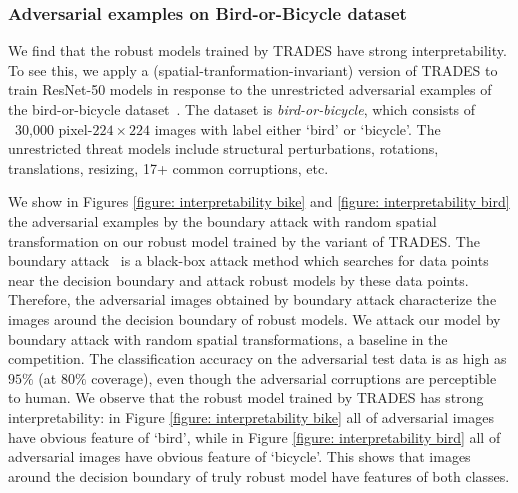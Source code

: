 \documentclass[11pt]{article}
\newcommand{\0}{\mathbf{0}}
\newcommand{\1}{\mathbf{1}}
\begin{document}
\subsubsection{Adversarial examples on Bird-or-Bicycle dataset}
We find that the robust models trained by TRADES have strong interpretability. To see this, we apply a (spatial-tranformation-invariant) version of TRADES to train ResNet-50 models in response to the unrestricted adversarial examples of the bird-or-bicycle dataset~\cite{brown2018unrestricted}. The dataset is \emph{bird-or-bicycle}, which consists of ~30,000 pixel-$224\times 224$ images with label either `bird' or `bicycle'. The unrestricted threat models include structural perturbations, rotations, translations, resizing, 17+ common corruptions, etc.

We show in Figures \ref{figure: interpretability bike} and \ref{figure: interpretability bird} the adversarial examples by the boundary attack with random spatial transformation on our robust model trained by the variant of TRADES. The boundary attack~\cite{brendel2017decision} is a black-box attack method which searches for data points near the decision boundary and attack robust models by these data points. Therefore, the adversarial images obtained by boundary attack characterize the images around the decision boundary of robust models. We attack our model by boundary attack with random spatial transformations, a baseline in the competition. The classification accuracy on the adversarial test data is as high as $95\%$ (at $80\%$ coverage), even though the adversarial corruptions are perceptible to human. We observe that the robust model trained by TRADES has strong interpretability: in Figure \ref{figure: interpretability bike} all of adversarial images have obvious feature of `bird', while in Figure \ref{figure: interpretability bird} all of adversarial images have obvious feature of `bicycle'. This shows that images around the decision boundary of truly robust model have features of both classes.

\newpage
\end{document}
